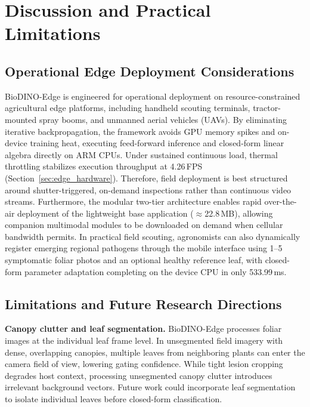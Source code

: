 \section{Discussion and Practical Limitations}
\label{sec:discussion}

\subsection{Operational Edge Deployment Considerations}
BioDINO-Edge is engineered for operational deployment on resource-constrained agricultural edge platforms, including handheld scouting terminals, tractor-mounted spray booms, and unmanned aerial vehicles (UAVs). By eliminating iterative backpropagation, the framework avoids GPU memory spikes and on-device training heat, executing feed-forward inference and closed-form linear algebra directly on ARM CPUs. Under sustained continuous load, thermal throttling stabilizes execution throughput at 4.26\,FPS (Section~\ref{sec:edge_hardware}). Therefore, field deployment is best structured around shutter-triggered, on-demand inspections rather than continuous video streams. Furthermore, the modular two-tier architecture enables rapid over-the-air deployment of the lightweight base application ($\approx$22.8\,MB), allowing companion multimodal modules to be downloaded on demand when cellular bandwidth permits. In practical field scouting, agronomists can also dynamically register emerging regional pathogens through the mobile interface using 1--5 symptomatic foliar photos and an optional healthy reference leaf, with closed-form parameter adaptation completing on the device CPU in only 533.99\,ms.

\subsection{Limitations and Future Research Directions}
\textbf{Canopy clutter and leaf segmentation.} BioDINO-Edge processes foliar images at the individual leaf frame level. In unsegmented field imagery with dense, overlapping canopies, multiple leaves from neighboring plants can enter the camera field of view, lowering gating confidence. While tight lesion cropping degrades host context, processing unsegmented canopy clutter introduces irrelevant background vectors. Future work could incorporate leaf segmentation to isolate individual leaves before closed-form classification.

